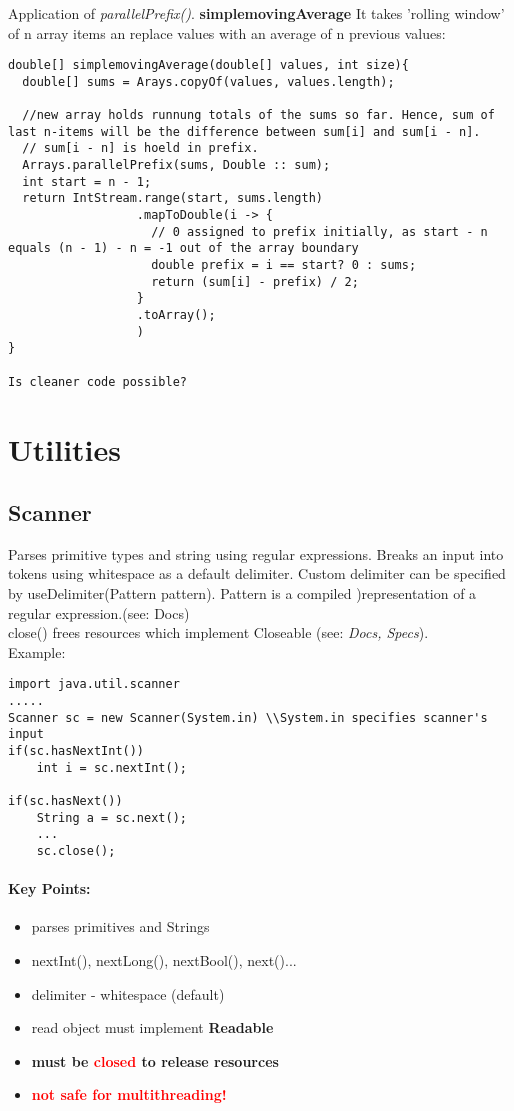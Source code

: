 \documentclass{report}
\begin{document}
Application of \textit{parallelPrefix()}. \textbf{simplemovingAverage} It takes 'rolling window' of n array items an replace values with an average of n previous values:
\begin{verbatim}
double[] simplemovingAverage(double[] values, int size){
  double[] sums = Arays.copyOf(values, values.length);
  
  //new array holds runnung totals of the sums so far. Hence, sum of last n-items will be the difference between sum[i] and sum[i - n].
  // sum[i - n] is hoeld in prefix. 
  Arrays.parallelPrefix(sums, Double :: sum);
  int start = n - 1;
  return IntStream.range(start, sums.length)
                  .mapToDouble(i -> {
                    // 0 assigned to prefix initially, as start - n equals (n - 1) - n = -1 out of the array boundary
                    double prefix = i == start? 0 : sums;
                    return (sum[i] - prefix) / 2;
                  }
                  .toArray();
                  )
}

Is cleaner code possible?
\end{verbatim}

\chapter{Utilities}
\section{Scanner}
Parses primitive types and string using regular expressions. Breaks an input into tokens using whitespace as a default delimiter. Custom delimiter can be specified by useDelimiter(Pattern pattern). Pattern is a compiled )representation of a regular expression.(see: Docs)\\
close() frees resources which implement Closeable (see: \textit{Docs, Specs}).\\
Example:
\begin{verbatim}
import java.util.scanner
.....
Scanner sc = new Scanner(System.in) \\System.in specifies scanner's input
if(sc.hasNextInt())
	int i = sc.nextInt();

if(sc.hasNext())
	String a = sc.next();
    ...
    sc.close();
\end{verbatim}

\subsubsection{Key Points:}
\begin{itemize}
\item parses primitives and Strings
\item nextInt(), nextLong(), nextBool(), next()...
\item delimiter - whitespace (default)
\item read object must implement \textbf{Readable}
\item \textbf{must be \textcolor{red}{closed} to release resources}
\item \textcolor{red}{\textbf{not safe for multithreading!}}
\end{itemize}
\end{document}
